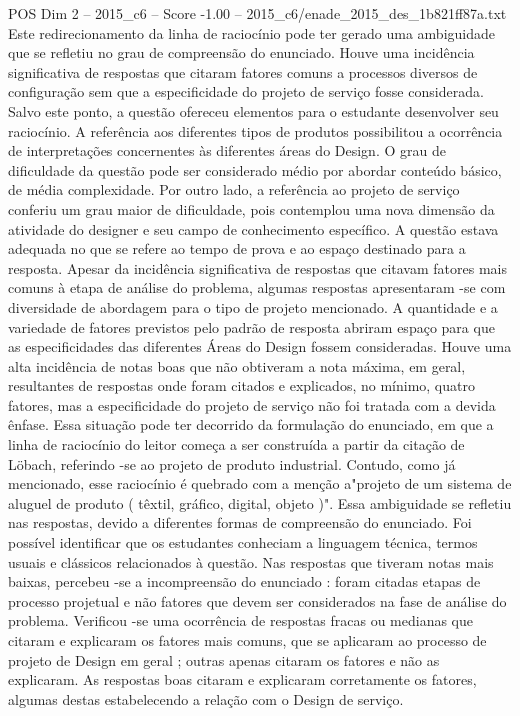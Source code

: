 \begin{textsample}{POS Dim 2 – 2015\_c6 – Score -1.00 – 2015\_c6/enade\_2015\_des\_1b821ff87a.txt}
Este redirecionamento da linha de raciocínio pode ter gerado uma ambiguidade que se refletiu no grau de compreensão do enunciado.
Houve uma incidência significativa de respostas que citaram fatores comuns a processos diversos de configuração sem que a especificidade do projeto de serviço fosse considerada.
Salvo este ponto, a questão ofereceu elementos para o estudante desenvolver seu raciocínio.
A referência aos diferentes tipos de produtos possibilitou a ocorrência de interpretações concernentes às diferentes áreas do Design.
O grau de dificuldade da questão pode ser considerado médio por abordar conteúdo básico, de média complexidade.
Por outro lado, a referência ao projeto de serviço conferiu um grau maior de dificuldade, pois contemplou uma nova dimensão da atividade do designer e seu campo de conhecimento específico.
A questão estava adequada no que se refere ao tempo de prova e ao espaço destinado para a resposta.
Apesar da incidência significativa de respostas que citavam fatores mais comuns à etapa de análise do problema, algumas respostas apresentaram -se com diversidade de abordagem para o tipo de projeto mencionado.
A quantidade e a variedade de fatores previstos pelo padrão de resposta abriram espaço para que as especificidades das diferentes Áreas do Design fossem consideradas.
Houve uma alta incidência de notas boas que não obtiveram a nota máxima, em geral, resultantes de respostas onde foram citados e explicados, no mínimo, quatro fatores, mas a especificidade do projeto de serviço não foi tratada com a devida ênfase.
Essa situação pode ter decorrido da formulação do enunciado, em que a linha de raciocínio do leitor começa a ser construída a partir da citação de Löbach, referindo -se ao projeto de produto industrial.
Contudo, como já mencionado, esse raciocínio é quebrado com a menção a"projeto de um sistema de aluguel de produto ( têxtil, gráfico, digital, objeto )".
Essa ambiguidade se refletiu nas respostas, devido a diferentes formas de compreensão do enunciado.
Foi possível identificar que os estudantes conheciam a linguagem técnica, termos usuais e clássicos relacionados à questão.
Nas respostas que tiveram notas mais baixas, percebeu -se a incompreensão do enunciado : foram citadas etapas de processo projetual e não fatores que devem ser considerados na fase de análise do problema.
Verificou -se uma ocorrência de respostas fracas ou medianas que citaram e explicaram os fatores mais comuns, que se aplicaram ao processo de projeto de Design em geral ; outras apenas citaram os fatores e não as explicaram.
As respostas boas citaram e explicaram corretamente os fatores, algumas destas estabelecendo a relação com o Design de serviço.

\end{textsample}

